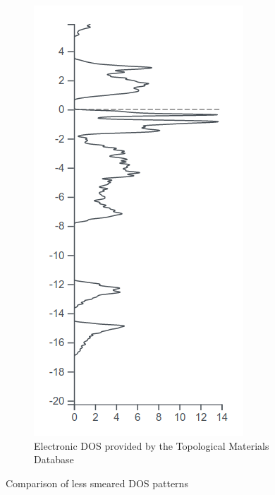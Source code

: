 \documentclass[11pt,a4paper]{article}
\begin{document}
\begin{figure}[H]
\begin{subfigure}[b]{0.33\textwidth}
\includegraphics[width=\textwidth]{images/dos3.png}
\caption{Electronic DOS provided by the Topological Materials Database}
\label{fig:dos3}
\end{subfigure}
\caption{Comparison of less smeared DOS patterns}
\label{fig:dosLessSmeared}
\end{figure}
\end{document}
